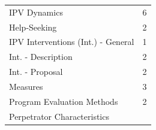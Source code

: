 \documentclass[]{tufte-handout}
\begin{document}
\begin{longtable}[]{@{}ll@{}}
\begin{minipage}[t]{0.50\columnwidth}
IPV Dynamics\strut
\end{minipage} & \begin{minipage}[t]{0.21\columnwidth}\raggedright\strut
6\strut
\end{minipage}\tabularnewline
\begin{minipage}[t]{0.50\columnwidth}\raggedright\strut
Help-Seeking\strut
\end{minipage} & \begin{minipage}[t]{0.21\columnwidth}\raggedright\strut
2\strut
\end{minipage}\tabularnewline
\begin{minipage}[t]{0.50\columnwidth}\raggedright\strut
IPV Interventions (Int.) - General\strut
\end{minipage} & \begin{minipage}[t]{0.21\columnwidth}\raggedright\strut
1\strut
\end{minipage}\tabularnewline
\begin{minipage}[t]{0.50\columnwidth}\raggedright\strut
Int. - Description\strut
\end{minipage} & \begin{minipage}[t]{0.21\columnwidth}\raggedright\strut
2\strut
\end{minipage}\tabularnewline
\begin{minipage}[t]{0.50\columnwidth}\raggedright\strut
Int. - Proposal\strut
\end{minipage} & \begin{minipage}[t]{0.21\columnwidth}\raggedright\strut
2\strut
\end{minipage}\tabularnewline
\begin{minipage}[t]{0.50\columnwidth}\raggedright\strut
Measures\strut
\end{minipage} & \begin{minipage}[t]{0.21\columnwidth}\raggedright\strut
3\strut
\end{minipage}\tabularnewline
\begin{minipage}[t]{0.50\columnwidth}\raggedright\strut
Program Evaluation Methods\strut
\end{minipage} & \begin{minipage}[t]{0.21\columnwidth}\raggedright\strut
2\strut
\end{minipage}\tabularnewline
\begin{minipage}[t]{0.50\columnwidth}\raggedright\strut
Perpetrator Characteristics\strut
\end{minipage} & \begin{minipage}[t]{0.21\columnwidth}\raggedright\strut

\end{minipage}
\end{longtable}
\end{document}
